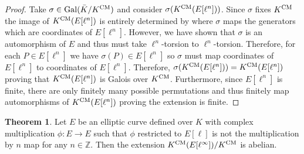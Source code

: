 \documentclass[12pt]{article}
\newcommand{\Z}{\mathbb{Z}}
\newcommand{\Gal}[1]{\mathrm{Gal} \small(#1 \small)}
\theoremstyle{remark}
\theoremstyle{definition}
\newtheorem{theorem}{Theorem}[section]
\begin{document}
\begin{proof}
Take $\sigma \in \Gal{\bar{K} / K^{\CM}}$ and consider $\sigma(K^{\mathrm{CM}} (E[\ell^n]))$. Since $\sigma$ fixes $K^{\mathrm{CM}}$ the image of $K^{\mathrm{CM}} (E[\ell^n])$ is entirely determined by where $\sigma$ maps the generators which are coordinates of $E[\ell^n]$. However, we have shown that $\sigma$ is an automorphism of $E$ and thus must take $\ell^n$-torsion to $\ell^n$-torsion. Therefore, for each $P \in E[\ell^n]$ we have $\sigma(P) \in E[\ell^n]$ so $\sigma$ must map coordinates of $E[\ell^n]$ to coordinates of $E[\ell^n]$. Therefore, $\sigma(K^{\mathrm{CM}} (E[\ell^n])) = K^{\mathrm{CM}} (E[\ell^n])$ proving that $K^{\mathrm{CM}} (E[\ell^n])$ is Galois over $K^{\mathrm{CM}}$. Furthermore, since $E[\ell^n]$ is finite, there are only finitely many possible permutations and thus finitely map automorphisms of $K^{\mathrm{CM}} (E[\ell^n])$ proving the extension is finite. 
\end{proof}

\begin{theorem}
Let $E$ be an elliptic curve defined over $K$ with complex multiplication $\phi : E \to E$ such that $\phi$ restricted to $E[\ell]$ is not the multiplication by $n$ map for any $n \in \Z$. Then the extension $K^{\mathrm{CM}}(E[\ell^\infty]) / K^{\mathrm{CM}}$ is abelian.  
\end{theorem}
\end{document}
